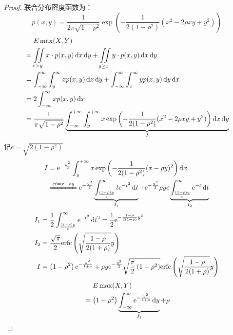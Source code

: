 \begin{proof}
    联合分布密度函数为：\[
        p(x,y) = \frac{1}{2\pi\sqrt{1-\rho^2}}
        \exp\left(-\frac{1}{2(1-\rho^2)}(x^2 - 2\rho xy + y^2)\right)
    \]
    \begin{align*}
        &\placeholder{=} E\max(X,Y)\\
        &= \iint\limits_{x>y} x\cdot p(x,y)
        \d{x}\d{y} + \iint\limits_{y\geq x} y\cdot p(x,y) \d{x}\d{y}\\
        &= \int_{-\infty}^{\infty } \int_{y}^{\infty } x
        p(x,y) \d{x} \d{y} + \int_{-\infty}^{\infty }
        \int_{x}^{\infty } y p(x,y) \d{y} \d{x}\\
        &= 2\int_{-\infty}^{\infty } xp(x,y) \d{x} \\
        &= \frac{1}{\pi \sqrt{1-\rho^{2}}}
        \underbrace{\int_{-\infty}^{+\infty} \int_{y}^{+\infty} x
            \exp\left( -\frac{1}{2(1-\rho^{2})}(x^{2} - 2\rho
        xy + y^{2}) \right) \d{x} \d{y}}_{I}
    \end{align*}
    记\(c = \sqrt{2(1-\rho^{2})}\)
    \begin{align*}
        I &= \e^{-\frac{y^{2}}{2}}\int_{y}^{+\infty} x \exp\left(
        -\frac{1}{2(1-\rho^{2})}(x -\rho y)^{2} \right) \d{x}\\
        & \xlongequal{ct = x-\rho y} \e^{-\frac{y^{2}}{2}}
        \underbrace{\int_{\frac{(1-\rho) y}{c}}^{\infty } t
        \e^{-t^{2}}  \d{t}}_{I_{1}} + \e^{-\frac{y^{2}}{2}} \rho y
        c \underbrace{\int_{\frac{(1-\rho)y}{c}}^{\infty}
        \e^{-t}  \d{t}}_{I_{2}}
    \end{align*}
    \begin{align*}
        I_{1} &= \frac{1}{2}
        \int_{\frac{(1-\rho)y}{c}}^{\infty } \e^{-t^{2}}
        \d{t^{2}} = \frac{1}{2} \e^{-\frac{1-\rho}{2(1+\rho)}y^{2}}\\
        I_{2} &= \frac{\sqrt{\pi}}{2} \erfc\left(
        \sqrt{\frac{1-\rho}{2(1+\rho)}}y \right)\\
        I &= \left( 1-\rho^{2}
        \right)\e^{-\frac{y^{2}}{1+\rho}} + \rho y
        \e^{-\frac{y^{2}}{2}}
        \sqrt{\frac{\pi}{2}\left( 1-\rho^{2} \right)}
        \erfc\left( \sqrt{\frac{1-\rho}{2(1+\rho)}}y \right)
    \end{align*}
    \begin{align*}
        &\placeholder{=} E\max(X,Y) \\
        &= \left( 1-\rho^{2} \right)
        \underbrace{\int_{-\infty }^{\infty}
        \e^{-\frac{y^{2}}{1+\rho}} \d{y}}_{J_{1}} + \rho

\end{align*}
\end{proof}
